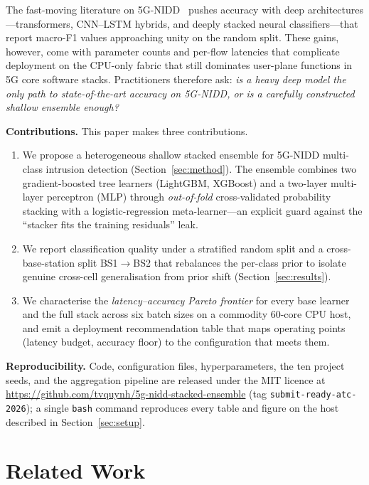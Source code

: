 \documentclass[conference]{IEEEtran}
\begin{document}
The fast-moving literature on 5G-NIDD~\cite{harshdeep2025_deeptransids,
farzaneh2024_dtl5g,ilias2025_cnn_moe,enids_2024} pushes accuracy
with deep architectures---transformers, CNN--LSTM hybrids, and deeply
stacked neural classifiers---that report macro-F1 values approaching
unity on the random split. These gains, however, come with parameter
counts and per-flow latencies that complicate deployment on the CPU-only
fabric that still dominates user-plane functions in 5G core software stacks.
Practitioners therefore ask: \emph{is a heavy deep model the only path to
state-of-the-art accuracy on 5G-NIDD, or is a carefully constructed
shallow ensemble enough?}

\textbf{Contributions.} This paper makes three contributions.
\begin{enumerate}
    \item We propose a heterogeneous shallow stacked ensemble for 5G-NIDD
        multi-class intrusion detection (Section~\ref{sec:method}). The
        ensemble combines two gradient-boosted tree learners (LightGBM,
        XGBoost) and a two-layer multi-layer perceptron (MLP) through
        \emph{out-of-fold} cross-validated probability stacking with a
        logistic-regression meta-learner---an explicit guard against the
        ``stacker fits the training residuals'' leak.
    \item We report classification quality under a stratified random
        split and a cross-base-station split BS1$\rightarrow$BS2 that
        rebalances the per-class prior to isolate genuine cross-cell
        generalisation from prior shift (Section~\ref{sec:results}).
    \item We characterise the \emph{latency--accuracy Pareto frontier}
        for every base learner and the full stack across six batch sizes
        on a commodity 60-core CPU host, and emit a deployment
        recommendation table that maps operating points (latency budget,
        accuracy floor) to the configuration that meets them.
\end{enumerate}

\textbf{Reproducibility.} Code, configuration files, hyperparameters,
the ten project seeds, and the aggregation pipeline are released under
the MIT licence at
\url{https://github.com/tvquynh/5g-nidd-stacked-ensemble} (tag
\texttt{submit-ready-atc-2026}); a single \texttt{bash} command
reproduces every table and figure on the host described in
Section~\ref{sec:setup}.

\section{Related Work}
\label{sec:related}
\end{document}
